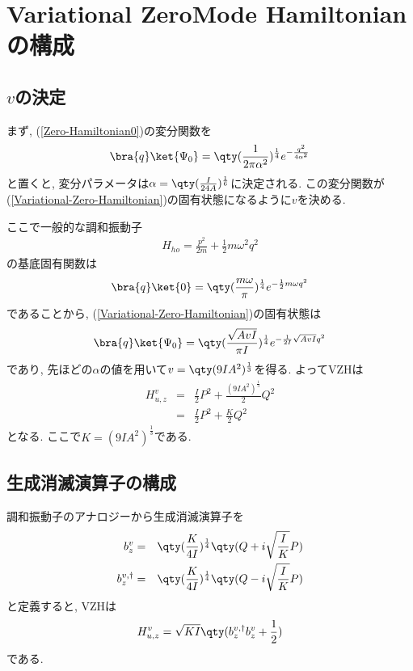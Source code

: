 \documentclass[10.5pt,a4paper]{jreport}
\begin{document}
\section{Variational ZeroMode Hamiltonianの構成}
\subsection{$v$の決定}
まず, (\ref{Zero-Hamiltonian0})の変分関数を
\begin{eqnarray}
  \bra{q}\ket{\Psi_0} = \qty(\frac{1}{2\pi\alpha^2})^{\frac14}e^{-\frac{q^2}{4\alpha^2}}
\end{eqnarray}
と置くと, 変分パラメータは$\alpha = \qty(\frac{I}{24A})^{\frac16}$に決定される. この変分関数が(\ref{Variational-Zero-Hamiltonian})の固有状態になるように$v$を決める. 

ここで一般的な調和振動子
\begin{eqnarray}
  H_{ho} = \frac{p^2}{2m} + \frac12m\omega^2q^2
\end{eqnarray}
の基底固有関数は
\begin{eqnarray}
  \bra{q}\ket{0} = \qty(\frac{m\omega}\pi)^{\frac14}e^{-\frac12 m\omega q^2}
\end{eqnarray}
であることから, (\ref{Variational-Zero-Hamiltonian})の固有状態は
\begin{eqnarray}
  \bra{q}\ket{\Psi_0} = \qty(\frac{\sqrt{AvI}}{\pi I})^{\frac14}e^{-\frac{1}{2I}\sqrt{AvI}q^2}
\end{eqnarray}
であり, 先ほどの$\alpha$の値を用いて$v=\qty(9IA^2)^{\frac13}$を得る. よってVZHは
\begin{eqnarray}
  \nonumber  H_{u, z}^v &=& \frac{I}{2}P^2 + \frac{(9IA^2)^{\frac13}}{2}Q^2\\
  &=& \frac{I}{2}P^2 + \frac{K}{2}Q^2\label{Variational-Zero-Hamiltonian}
\end{eqnarray}
となる. ここで$K = (9IA^2)^{\frac13}$である. 
\subsection{生成消滅演算子の構成}
調和振動子のアナロジーから生成消滅演算子を
\begin{eqnarray}
  b_z^v &=& \qty(\frac{K}{4I})^{\frac14}\qty(Q + i\sqrt{\frac{I}{K}} P)\\
  b_z^{v, \dagger} &=& \qty(\frac{K}{4I})^{\frac14}\qty(Q - i\sqrt{\frac{I}{K}} P)
\end{eqnarray}
と定義すると, VZHは
\begin{eqnarray}
  H_{u, z}^v = \sqrt{KI}\qty(b_z^{v, \dagger}b_z^v + \frac12)
\end{eqnarray}
である.
\end{document}
